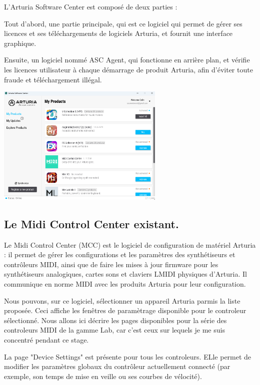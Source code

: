 \documentclass[francais]{rapportPFE}  %
\begin{document}
L'Arturia Software Center est composé de deux parties : 

Tout d'abord, une partie principale, qui est ce logiciel qui permet de gérer ses licences et ses téléchargements de logiciels Arturia, et fournit une interface graphique.

Ensuite, un logiciel nommé ASC Agent, qui fonctionne en arrière plan, et vérifie les licences utilisateur à chaque démarrage de produit Arturia, afin d'éviter toute fraude et téléchargement illégal.

\begin{center}
	\centering
	\includegraphics[width=0.6\textwidth]{graphics/asc_existant.png}
	\begin{tiny}
	\end{tiny}
	\label{fig}
\end{center}

\subsection{Le Midi Control Center existant.}

Le Midi Control Center \cite{mcc}
 (MCC) est le logiciel de configuration de matériel Arturia : il
permet de gérer les configurations et les paramètres des synthétiseurs et contrôleurs MIDI, ainsi que de faire les mises à jour firmware pour les synthétiseurs analogiques, cartes sons et claviers LMIDI physiques d'Arturia. Il communique en norme MIDI avec les produits Arturia pour leur configuration.

Nous pouvons, sur ce logiciel, sélectionner un appareil Arturia parmis la liste proposée. Ceci affiche les fenêtres de paramètrage disponible pour le controleur sélectionné. Nous allons ici décrire les pages disponibles pour la série des controleurs MIDI de la gamme Lab, car c'est ceux sur lequels je me suis concentré pendant ce stage.

La page "Device Settings" est présente pour tous les controleurs. ELle permet de modifier les paramètres globaux du contrôleur actuellement connecté (par exemple, son temps de mise en veille ou ses courbes de vélocité).
\end{document}
